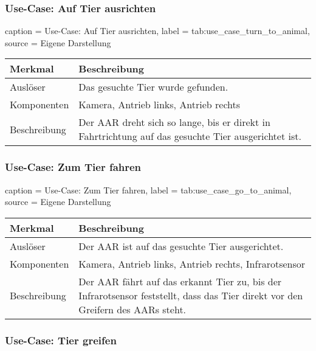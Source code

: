 \subsubsection{Use-Case: Auf Tier ausrichten}

\begin{dhbwtable}{%
    caption	= Use-Case: Auf Tier ausrichten,
    label	= tab:use_case_turn_to_animal,
    source	= Eigene Darstellung
}
    \begin{tabular}{ll}
        \toprule
        \textbf{Merkmal}     & \textbf{Beschreibung}  \\\midrule
        Auslöser     & Das gesuchte Tier wurde gefunden.\\
        Komponenten  & Kamera, Antrieb links, Antrieb rechts\\
        Beschreibung & Der \ac{AAR} dreht sich so lange, bis er direkt in Fahrtrichtung auf das gesuchte Tier ausgerichtet ist.\\\bottomrule
    \end{tabular}    
\end{dhbwtable}

\subsubsection{Use-Case: Zum Tier fahren}

\begin{dhbwtable}{%
    caption	= Use-Case: Zum Tier fahren,
    label	= tab:use_case_go_to_animal,
    source	= Eigene Darstellung
}
    \begin{tabular}{ll}
        \toprule
        \textbf{Merkmal}     & \textbf{Beschreibung}  \\\midrule
        Auslöser     & Der \ac{AAR} ist auf das gesuchte Tier ausgerichtet.\\
        Komponenten  & Kamera, Antrieb links, Antrieb rechts, Infrarotsensor\\
        Beschreibung & Der \ac{AAR} fährt auf das erkannt Tier zu, bis der Infrarotsensor feststellt, dass das Tier direkt vor den Greifern des \acp{AAR} steht.\\\bottomrule
    \end{tabular}    
\end{dhbwtable}

\subsubsection{Use-Case: Tier greifen}

